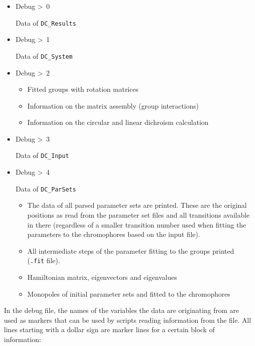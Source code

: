 \documentclass[11pt, letterpaper]{article}
\begin{document}
\begin{itemize}
\item Debug \textgreater\ 0

Data of \verb'DC_Results'

\item Debug \textgreater\ 1

Data of \verb'DC_System'

\item Debug \textgreater\ 2
\begin{itemize}
\item Fitted groups with rotation matrices
\item Information on the matrix assembly (group interactions)
\item Information on the circular and linear dichroism calculation
\end{itemize}

\item Debug \textgreater\ 3

Data of \verb'DC_Input'

\item Debug \textgreater\ 4

Data of \verb'DC_ParSets'

\begin{itemize}
\item The data of all parsed parameter sets are printed. These are the original positions as read from the parameter set files and all transitions available in there (regardless of a smaller transition number used when fitting the parameters to the chromophores based on the input file).

\item All intermediate steps of the parameter fitting to the groups printed (\verb'.fit' file).

\item Hamiltonian matrix, eigenvectors and eigenvalues

\item Monopoles of initial parameter sets and fitted to the chromophores
\end{itemize}

\end{itemize}

In the debug file, the names of the variables the data are originating from are used as markers that can be used by scripts reading information from the file. All lines starting with a dollar sign are marker lines for a certain block of information:
\end{document}
